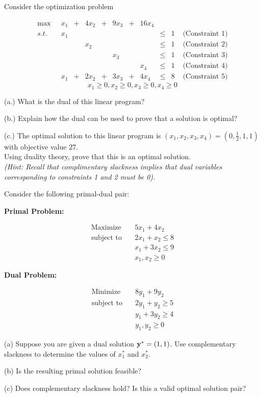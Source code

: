 \begin{ex}
Consider the optimization problem

\begin{equation*}
\begin{array}{rrrrrrrrrrrrrrrrr}
\max \ \ \ &   x_1 &+ &4 x_2 &+& 9x_3 &+& 16 x_4&\\
s.t. \ \ 
& x_1& &&&&&&\leq &1& \text{ (Constraint 1)}\\
&&& x_2 &&&&&\leq &1& \text{ (Constraint 2)}\\
&&&&& x_3&&& \leq &1& \text{ (Constraint 3)}\\
&&&&&&& x_4 &\leq &1& \text{ (Constraint 4)}\\
& x_1 &+& 2x_2& + &3x_3 &+& 4x_4 &\leq &8 & \text{ (Constraint 5)}
\end{array}
\end{equation*}
$$ x_1 \geq 0, x_2 \geq 0, x_3 \geq 0, x_4 \geq 0
$$

(a.) What is the dual of this linear program?

(b.) Explain how the dual can be used to prove that a solution is optimal?

(c.) The optimal solution to this linear program is $(x_1, x_2, x_3, x_4) = (0,\tfrac{1}{2},1,1)$ with objective value $27$.  \\

Using duality theory, prove that this is an optimal solution.  \\
\textit{(Hint: Recall that complimentary slackness implies that dual variables corresponding to constraints 1 and 2 must be 0).  }
\end{ex}

\begin{ex}

Consider the following primal-dual pair:

\textbf{Primal Problem:}

$$
\begin{aligned}
\text{Maximize} \quad & 5x_1 + 4x_2 \\
\text{subject to} \quad & 2x_1 + x_2 \leq 8 \\
& x_1 + 3x_2 \leq 9 \\
& x_1, x_2 \geq 0
\end{aligned}
$$

\textbf{Dual Problem:}

$$
\begin{aligned}
\text{Minimize} \quad & 8y_1 + 9y_2 \\
\text{subject to} \quad & 2y_1 + y_2 \geq 5 \\
& y_1 + 3y_2 \geq 4 \\
& y_1, y_2 \geq 0
\end{aligned}
$$

(a) Suppose you are given a dual solution $\mathbf{y}^* = (1, 1)$. Use complementary slackness to determine the values of $x_1^*$ and $x_2^*$.

(b) Is the resulting primal solution feasible?

(c) Does complementary slackness hold? Is this a valid optimal solution pair?
\end{ex}


